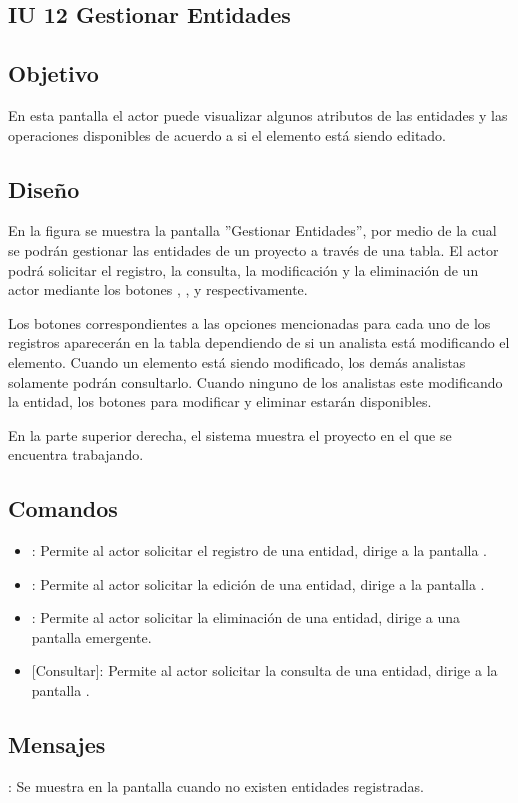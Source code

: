 \subsection{IU 12 Gestionar Entidades}

\subsection{Objetivo}
	En esta pantalla el actor puede visualizar algunos atributos de las entidades y las operaciones disponibles de acuerdo a si el elemento está siendo editado.
\subsection{Diseño}
	En la figura  se muestra la pantalla ''Gestionar Entidades'', por medio de la cual se podrán gestionar las entidades de un proyecto a través de una tabla. El actor podrá solicitar el registro, la consulta, la modificación y la eliminación de un actor mediante los botones , , \editar y \eliminar respectivamente.
	
	Los botones correspondientes a las opciones mencionadas para cada uno de los registros aparecerán en la tabla dependiendo de si un analista está modificando el elemento. Cuando un elemento está siendo modificado, los demás analistas solamente podrán consultarlo. Cuando ninguno de los analistas este modificando la entidad, los botones para modificar y eliminar estarán disponibles.
	
	En la parte superior derecha, el sistema muestra el proyecto en el que se encuentra trabajando.

\subsection{Comandos}
\begin{itemize}
	\item {}: Permite al actor solicitar el registro de una entidad, dirige a la pantalla .
	\item \editar [Modificar]: Permite al actor solicitar la edición de una entidad, dirige a la pantalla .
	\item \eliminar [Eliminar]: Permite al actor solicitar la eliminación de una entidad, dirige a una pantalla emergente.
	\item {} [Consultar]: Permite al actor solicitar la consulta de una entidad, dirige a la pantalla  .
\end{itemize}
\subsection{Mensajes}

\begin{Citemize}
	\item {}: Se muestra en la pantalla  cuando no existen entidades registradas.
\end{Citemize}
